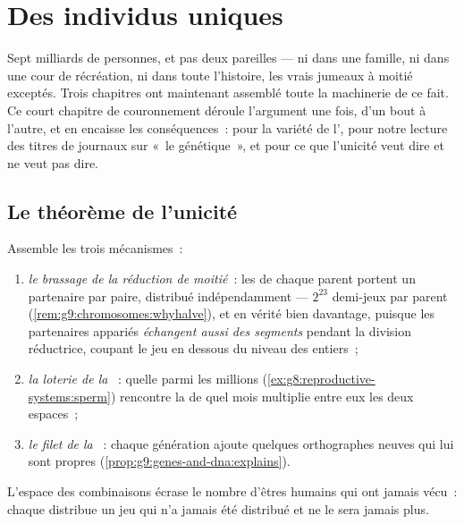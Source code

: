 \chapter{Des individus uniques}\label{ch:g9:unique-individuals}

Sept milliards de personnes, et pas deux pareilles --- ni
dans une famille, ni dans une cour de récréation, ni dans
toute l'histoire, les vrais jumeaux à moitié exceptés. Trois
chapitres ont maintenant assemblé toute la machinerie de ce
fait. Ce court chapitre de couronnement déroule l'argument
une fois, d'un bout à l'autre, et en encaisse les
conséquences~: pour la variété de l', pour notre
lecture des titres de journaux sur «~le génétique~», et pour
ce que l'unicité veut dire et ne veut pas dire.

\section{Le théorème de l'unicité}

\begin{proposition}\label{prop:g9:unique-individuals:theorem}
Assemble les trois mécanismes~:
\begin{enumerate}
  \item \emph{le brassage de la réduction de moitié}~: les
         de chaque parent portent un partenaire par
        paire, distribué indépendamment --- $2^{23}$
        demi-jeux par parent
        (\cref{rem:g9:chromosomes:whyhalve}), et en vérité
        bien davantage, puisque les partenaires appariés
        \emph{échangent aussi des segments} pendant la
        division réductrice, coupant le jeu en dessous du
        niveau des  entiers~;
  \item \emph{la loterie de la }~: quelle
         parmi les millions
        (\cref{ex:g8:reproductive-systems:sperm}) rencontre
        la  de quel mois multiplie entre eux les
        deux espaces~;
  \item \emph{le filet de la }~: chaque génération
        ajoute quelques orthographes neuves qui lui sont
        propres (\cref{prop:g9:genes-and-dna:explains}).
\end{enumerate}
L'espace des combinaisons écrase le nombre d'êtres humains
qui ont jamais vécu~: chaque  distribue un jeu
qui n'a jamais été distribué et ne le sera jamais plus.
\end{proposition}
\admitted

